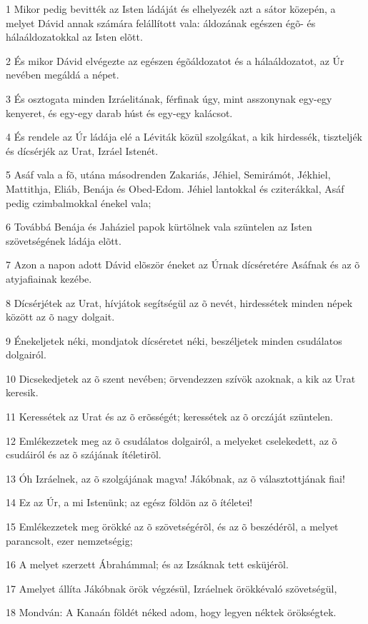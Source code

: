 \par 1 Mikor pedig bevitték az Isten ládáját és elhelyezék azt a sátor közepén, a melyet Dávid annak számára felállított vala: áldozának egészen égõ- és hálaáldozatokkal az Isten elõtt.
\par 2 És mikor Dávid elvégezte az egészen égõáldozatot és a hálaáldozatot, az Úr nevében megáldá a népet.
\par 3 És osztogata minden Izráelitának, férfinak úgy, mint asszonynak egy-egy kenyeret, és egy-egy darab húst és egy-egy kalácsot.
\par 4 És rendele az Úr ládája elé a Léviták közül szolgákat, a kik hirdessék, tiszteljék és dícsérjék az Urat, Izráel Istenét.
\par 5 Asáf vala a fõ, utána másodrenden Zakariás, Jéhiel, Semirámót, Jékhiel, Mattithja, Eliáb, Benája és Obed-Edom. Jéhiel lantokkal és cziterákkal, Asáf pedig czimbalmokkal énekel vala;
\par 6 Továbbá Benája és Jaháziel papok kürtölnek vala szüntelen az Isten szövetségének ládája elõtt.
\par 7 Azon a napon adott Dávid elõször éneket az Úrnak dícséretére Asáfnak és az õ atyjafiainak kezébe.
\par 8 Dícsérjétek az Urat, hívjátok segítségül az õ nevét, hirdessétek minden népek között az õ nagy dolgait.
\par 9 Énekeljetek néki, mondjatok dícséretet néki, beszéljetek minden csudálatos dolgairól.
\par 10 Dicsekedjetek az õ szent nevében; örvendezzen szívök azoknak, a kik az Urat keresik.
\par 11 Keressétek az Urat és az õ erõsségét; keressétek az õ orczáját szüntelen.
\par 12 Emlékezzetek meg az õ csudálatos dolgairól, a melyeket cselekedett, az õ csudáiról és az õ szájának ítéletirõl.
\par 13 Óh Izráelnek, az õ szolgájának magva! Jákóbnak, az õ választottjának fiai!
\par 14 Ez az Úr, a mi Istenünk; az egész földön az õ ítéletei!
\par 15 Emlékezzetek meg örökké az õ szövetségérõl, és az õ beszédérõl, a melyet parancsolt, ezer nemzetségig;
\par 16 A melyet szerzett Ábrahámmal; és az  Izsáknak tett esküjérõl.
\par 17 Amelyet állíta Jákóbnak örök végzésül, Izráelnek örökkévaló szövetségül,
\par 18 Mondván: A Kanaán földét néked adom, hogy legyen néktek örökségtek.

